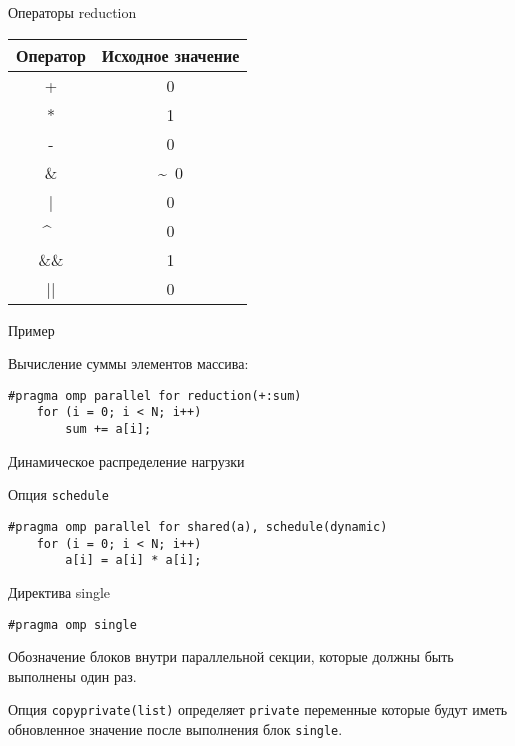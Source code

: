 \begin{frame}{Операторы reduction}
\begin{table}[htpb]
    \centering
    \begin{tabular}{|c|c|}
    \hline
    Оператор    &   Исходное значение   \\
    \hline
    +           &   0                   \\
    \hline
    *           &   1                   \\
    \hline
    -           &   0                   \\
    \hline
    \&          &   \~~0                \\
    \hline
    |           &   0                   \\
    \hline
    \^~         &   0                   \\
    \hline
    \&\&        &   1                   \\
    \hline
    ||          &   0                   \\
    \hline
    \end{tabular}
\end{table}
\end{frame}

\begin{frame}[fragile]{Пример}

Вычисление суммы элементов массива:

\begin{lstlisting}
#pragma omp parallel for reduction(+:sum)
    for (i = 0; i < N; i++)
        sum += a[i];
\end{lstlisting}

\end{frame}

\begin{frame}[fragile]{Динамическое распределение нагрузки}

Опция \texttt{schedule}

\begin{lstlisting}[basicstyle=\scriptsize]
#pragma omp parallel for shared(a), schedule(dynamic)
    for (i = 0; i < N; i++)
        a[i] = a[i] * a[i];
\end{lstlisting}

\end{frame}

\begin{frame}[fragile]{Директива single}

\begin{lstlisting}
#pragma omp single
\end{lstlisting}

Обозначение блоков внутри параллельной секции, которые должны быть выполнены
один раз.

\bigskip

\pause

Опция \texttt{copyprivate(list)} определяет \texttt{private} переменные которые
будут иметь обновленное значение после выполнения блок \texttt{single}.

\end{frame}

